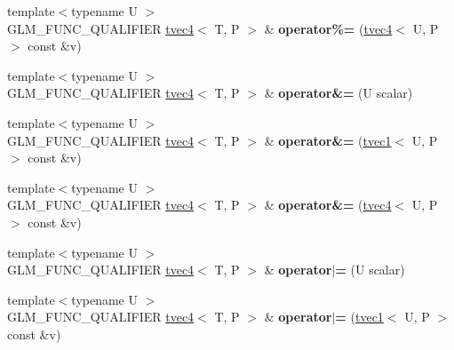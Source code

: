 \begin{DoxyCompactItemize}
\item 
\hypertarget{structglm_1_1tvec4_a03faa16c94b7cb1e2082aebede1451c2}{{\footnotesize template$<$typename U $>$ }\\G\-L\-M\-\_\-\-F\-U\-N\-C\-\_\-\-Q\-U\-A\-L\-I\-F\-I\-E\-R \hyperlink{structglm_1_1tvec4}{tvec4}$<$ T, P $>$ \& {\bfseries operator\%=} (\hyperlink{structglm_1_1tvec4}{tvec4}$<$ U, P $>$ const \&v)}\label{structglm_1_1tvec4_a03faa16c94b7cb1e2082aebede1451c2}

\item 
\hypertarget{structglm_1_1tvec4_a0ee724176fd182cc8666600a6f2a9020}{{\footnotesize template$<$typename U $>$ }\\G\-L\-M\-\_\-\-F\-U\-N\-C\-\_\-\-Q\-U\-A\-L\-I\-F\-I\-E\-R \hyperlink{structglm_1_1tvec4}{tvec4}$<$ T, P $>$ \& {\bfseries operator\&=} (U scalar)}\label{structglm_1_1tvec4_a0ee724176fd182cc8666600a6f2a9020}

\item 
\hypertarget{structglm_1_1tvec4_ad19ec50f613001b73a1eae23d9411d71}{{\footnotesize template$<$typename U $>$ }\\G\-L\-M\-\_\-\-F\-U\-N\-C\-\_\-\-Q\-U\-A\-L\-I\-F\-I\-E\-R \hyperlink{structglm_1_1tvec4}{tvec4}$<$ T, P $>$ \& {\bfseries operator\&=} (\hyperlink{structglm_1_1tvec1}{tvec1}$<$ U, P $>$ const \&v)}\label{structglm_1_1tvec4_ad19ec50f613001b73a1eae23d9411d71}

\item 
\hypertarget{structglm_1_1tvec4_a2513499d4dc631ebfc50913c7068caef}{{\footnotesize template$<$typename U $>$ }\\G\-L\-M\-\_\-\-F\-U\-N\-C\-\_\-\-Q\-U\-A\-L\-I\-F\-I\-E\-R \hyperlink{structglm_1_1tvec4}{tvec4}$<$ T, P $>$ \& {\bfseries operator\&=} (\hyperlink{structglm_1_1tvec4}{tvec4}$<$ U, P $>$ const \&v)}\label{structglm_1_1tvec4_a2513499d4dc631ebfc50913c7068caef}

\item 
\hypertarget{structglm_1_1tvec4_ae8690e557100d8299871ab1809e5dea7}{{\footnotesize template$<$typename U $>$ }\\G\-L\-M\-\_\-\-F\-U\-N\-C\-\_\-\-Q\-U\-A\-L\-I\-F\-I\-E\-R \hyperlink{structglm_1_1tvec4}{tvec4}$<$ T, P $>$ \& {\bfseries operator$\vert$=} (U scalar)}\label{structglm_1_1tvec4_ae8690e557100d8299871ab1809e5dea7}

\item 
\hypertarget{structglm_1_1tvec4_a8f18846441fd6ad08154311274a37fd8}{{\footnotesize template$<$typename U $>$ }\\G\-L\-M\-\_\-\-F\-U\-N\-C\-\_\-\-Q\-U\-A\-L\-I\-F\-I\-E\-R \hyperlink{structglm_1_1tvec4}{tvec4}$<$ T, P $>$ \& {\bfseries operator$\vert$=} (\hyperlink{structglm_1_1tvec1}{tvec1}$<$ U, P $>$ const \&v)}\label{structglm_1_1tvec4_a8f18846441fd6ad08154311274a37fd8}


\end{DoxyCompactItemize}
